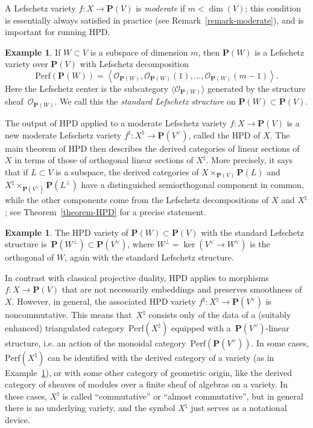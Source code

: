 \documentclass[11pt, reqno]{amsart}
\numberwithin{equation}{section}
\theoremstyle{plain}
\theoremstyle{definition}
\newtheorem{example}[theorem]{Example}
\newcommand{\Perf}{\mathrm{Perf}}
\newcommand{\hpd}{{\natural}}
\newcommand{\svee}{\scriptscriptstyle\vee}
\newcommand{\llangle}{\left \langle}
\newcommand{\rrangle}{\right \rangle}
\newcommand{\vV}{V^{\svee}}
\newcommand{\cO}{\mathcal{O}}
\newcommand{\bP}{\mathbf{P}}
\begin{document}
A Lefschetz variety $f \colon X \to \bP(V)$ is \emph{moderate} if $m < \dim(V)$;
this condition is essentially always satisfied in practice (see Remark~\ref{remark-moderate}),
and is important for running HPD.

\begin{example}
\label{example-linear-HPD}
If $W \subset V$ is a subspace of dimension $m$, then $\bP(W)$ is a Lefschetz variety over $\bP(V)$ 
with Lefschetz decomposition 
\begin{equation}
\label{eq:lefschetz-standard}
\Perf(\bP(W)) = \llangle \cO_{\bP(W)}, \cO_{\bP(W)}(1), \dots, \cO_{\bP(W)}(m-1) \rrangle.
\end{equation} 
Here the Lefschetz center is the subcategory $\langle \cO_{\bP(W)} \rangle$ 
generated by the structure sheaf~$\cO_{\bP(W)}$.
We call this the \emph{standard Lefschetz structure} on $\bP(W) \subset \bP(V)$. 
\end{example} 

The output of HPD applied to a moderate Lefschetz variety $f \colon X \to \bP(V)$
is a new moderate Lefschetz variety $f^\hpd \colon X^{\hpd} \to \bP(\vV)$, called the HPD of $X$.
The main theorem of HPD then describes the derived categories of linear sections of $X$ 
in terms of those of orthogonal linear sections of $X^{\hpd}$. 
More precisely, it says that if $L \subset V$ is a subspace, 
the derived categories of $X \times_{\bP(V)} \bP(L)$ and $X^{\hpd} \times_{\bP(\vV)} \bP(L^\perp)$
have a distinguished semiorthogonal component in common, while the other components 
come from the Lefschetz decompositions of $X$ and $X^{\hpd}$;
see Theorem~\ref{theorem-HPD} for a precise statement.

\begin{example}
\label{example:HPD-linear}
The HPD variety of $\bP(W) \subset \bP(V)$ with the standard Lefschetz structure 
is~$\bP(W^\perp) \subset \bP(\vV)$, where $W^\perp = \ker(\vV \to W^{\svee})$ is the orthogonal of $W$,
again with the standard Lefschetz structure.
\end{example}

In contrast with classical projective duality, HPD applies to morphisms $f \colon X \to \bP(V)$ 
that are not necessarily embeddings and preserves smoothness of $X$. 
However, in general, the associated HPD variety $f^{\hpd} \colon X^\hpd \to \bP(\vV)$ is noncommutative. 
This means that~$X^\hpd$ consists only of the data of a 
(suitably enhanced) triangulated category~$\Perf(X^\hpd)$  
equipped with a~$\bP(\vV)$-linear structure,  
i.e. an action of the monoidal category~$\Perf(\bP(\vV))$. 
In some cases,  
$\Perf(X^\hpd)$ can be identified with the derived category of a 
variety (as in Example~\ref{example:HPD-linear}), or with some other category of geometric origin, 
like the derived category of sheaves of modules over a finite sheaf of algebras on a variety. 
In these cases, $X^\hpd$ is called ``commutative'' or ``almost commutative'', 
but in general there is no underlying variety, and the symbol $X^\hpd$ 
just serves as a notational device. 
\end{document}
